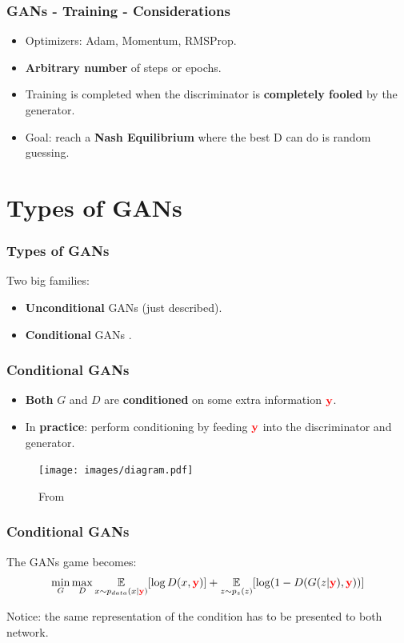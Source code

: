 \documentclass{beamer}
\begin{document}
\begin{frame}
	\frametitle{GANs - Training - Considerations}
	\begin{itemize}
		\item Optimizers: Adam, Momentum, RMSProp.
		\item \textbf{Arbitrary number} of steps or epochs.
		\item Training is completed when the discriminator is \textbf{completely fooled} by the generator.
		\item Goal: reach a \textbf{Nash Equilibrium} where the best D can do is random guessing.
	\end{itemize}
 \end{frame}
 
\section{Types of GANs}

\begin{frame}
	\frametitle{Types of GANs}
	Two big families:
	\begin{itemize}
		\item \textbf{Unconditional} GANs (just described).
		\item \textbf{Conditional} GANs \citep{mirzaConditionalGenerativeAdversarial2014}.
	\end{itemize}
\end{frame}

\begin{frame}
	\frametitle{Conditional GANs}
	\begin{itemize}
		\item \textbf{Both} $G$ and $D$ are \textbf{conditioned} on some extra information $ \color{red} \mathbf{y}$.
		\item In \textbf{practice}:  perform conditioning by feeding $\color{red} \mathbf{y}$ into the discriminator and generator.
	\end{itemize}
	\vspace{-1cm}
	\begin{figure}
		\texttt{[image: images/diagram.pdf]}
		\vspace{-1cm}
		\caption{From \cite{mirzaConditionalGenerativeAdversarial2014}}
	\end{figure}
\end{frame}

\begin{frame}
	\frametitle{Conditional GANs}
	The GANs game becomes:
	$$ 
	\min_G \max_D \underset{x \sim p_{data}(x| \textcolor{red}{\mathbf{y}})}{\mathbb{E}} [\log D(x, \textcolor{red}{\mathbf{y}})]  +\underset{z \sim p_z(z)}{\mathbb{E}}[\log(1 - D(G(z|\textcolor{red}{\mathbf{y}}),\textcolor{red}{\mathbf{y}}))]
	$$

	\begin{block}{}
		Notice: the same representation of the condition has to be presented to both network.
	\end{block}
\end{frame}
\end{document}

